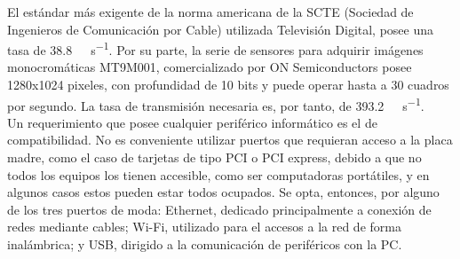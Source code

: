 


El estándar más exigente de la norma americana de la SCTE (Sociedad de Ingenieros de Comunicación por Cable) utilizada Televisión Digital, posee una tasa de \SI{38.8}{\mega\bit\per\second}\cite{SocietyofCableTelecommuniocationsEngineers2006}. Por su parte, la serie de sensores para adquirir imágenes monocromáticas MT9M001, comercializado por ON Semiconductors posee 1280x1024 pixeles, con profundidad de 10 bits y puede operar hasta a 30 cuadros por segundo\cite{MicronTechnology2004}. La tasa de transmisión necesaria es, por tanto, de \SI{393.2}{\mega\bit\per\second}.\\

Un requerimiento que posee cualquier periférico informático es el de compatibilidad. No es conveniente utilizar puertos que requieran acceso a la placa madre, como el caso de tarjetas de tipo PCI o PCI express, debido a que no todos los equipos los tienen accesible, como ser computadoras portátiles, y en algunos casos estos pueden estar todos ocupados. Se opta, entonces, por alguno de los tres puertos de moda: Ethernet, dedicado principalmente a conexión de redes mediante cables; Wi-Fi, utilizado para el accesos a la red de forma inalámbrica; y USB, dirigido a la comunicación de periféricos con la PC.\\

